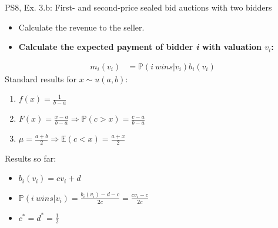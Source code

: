 \begin{frame}{PS8, Ex. 3.b: First- and second-price sealed bid auctions with two bidders}
    \begin{multicols}{2}
      \begin{itemize}
        \item[(b)] Calculate the revenue to the seller.
        \item[\nth{1} step:] \textbf{Calculate the expected payment of bidder \textit{i} with valuation $v_i$:}
      \end{itemize}
      \vspace{-12pt}
      \begin{align*}
        m_i(v_i)&=\mathbb{P}(i\ wins|v_i)b_i(v_i)
      \end{align*}
      \vfill\null\columnbreak
      Standard results for $x\sim u(a, b):$
      \vspace{-6pt}
      \begin{enumerate}
        \item[PDF:] $f(x)=\frac{1}{b-a}$
        \item[CDF:] $F(x)=\frac{x-a}{b-a}\Rightarrow\mathbb{P}(c>x)=\frac{c-a}{b-a}$
        \item[Mean:] $\mu=\frac{a+b}{2}\Rightarrow\mathbb{E}(c<x)=\frac{a+x}{2}$
      \end{enumerate}
      \vspace{-6pt}
      Results so far:
      \vspace{-6pt}
      \begin{itemize}
        \item[($*$)]  $b_i(v_i) = cv_i+d$
        \item[($**$)] $\mathbb{P}(i\ wins|v_i)=\frac{b_i(v_i)-d-c}{2c}=\frac{cv_i-c}{2c}$
        \item[(3.a)]    $c^*=d^*=\frac{1}{2}$
      \end{itemize}
      \vfill\null
    \end{multicols}
\end{frame}
